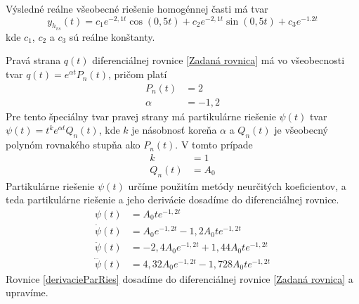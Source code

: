 \documentclass[a4paper, 10pt, ]{article}
\begin{document}
Výsledné reálne všeobecné riešenie homogénnej časti má tvar
\begin{equation} \label{Výsledné reálne všeobecné riešenie homogénnej}
	y_{h_{vs}}(t) = c_1 e^{-2,1t} \cos(0,5t) + c_2 e^{-2,1t} \sin(0,5t) + c_3 e^{-1.2t}
\end{equation}
kde $c_1$, $c_2$ a $c_3$ sú reálne konštanty.







Pravá strana $q(t)$ diferenciálnej rovnice \eqref{Zadaná rovnica} má vo všeobecnosti tvar $q(t) = e^{\alpha t} P_n(t)$, pričom platí
\begin{subequations}
	\begin{align}
		P_n(t) &= 2 \\
		\alpha &= -1,2
	\end{align}
\end{subequations}
Pre tento špeciálny tvar pravej strany má partikulárne riešenie $\psi(t)$ tvar $\psi(t) = t^k e^{\alpha t} Q_n(t)$, kde $k$ je násobnosť koreňa $\alpha$ a $Q_n(t)$ je všeobecný polynóm rovnakého stupňa ako $P_n(t)$. V tomto prípade
\begin{subequations}
	\begin{align}
		k &= 1 \\
		Q_n(t) &= A_0
	\end{align}
\end{subequations}
Partikulárne riešenie $\psi(t)$ určíme použitím metódy neurčitých koeficientov, a teda partikulárne riešenie a jeho derivácie dosadíme do diferenciálnej rovnice.
\begin{subequations} \label{derivacieParRies}
	\begin{align}
		\psi(t) &= A_0 t e^{-1,2 t} \\
		\dot{\psi}(t) &=  A_0 e^{-1,2t} - 1,2 A_0 t e^{-1,2t}\\
		\ddot{\psi}(t) &= -2,4 A_0 e^{-1,2t} + 1,44 A_0 t e^{-1,2t} \\
		\dddot{\psi}(t) &= 4,32 A_0 e^{-1,2t} - 1,728 A_0 t e^{-1,2t}
	\end{align}
\end{subequations}
Rovnice \eqref{derivacieParRies} dosadíme do diferenciálnej rovnice \eqref{Zadaná rovnica} a upravíme.
\end{document}
